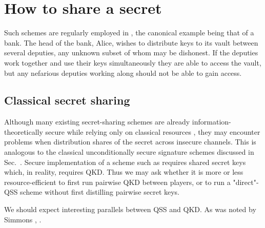 \section{How to share a secret}
Such schemes are regularly employed in , the canonical example being that of a bank. The head of the bank, Alice, wishes to distribute keys to its vault between several deputies, any unknown subset of whom may be dishonest. If the deputies work together and use their keys simultaneously they are able to access the vault, but any nefarious deputies working along should not be able to gain access.

\subsection*{Classical secret sharing}
Although many existing secret-sharing schemes are already information-theoretically secure while relying only on classical resources , they may encounter problems when distribution shares of the secret across insecure channels.  This is analogous to the classical unconditionally secure signature schemes discussed in Sec.~. Secure implementation of a scheme such as  requires shared secret keys which, in reality, requires QKD. Thus we may ask whether it is more or less resource-efficient to first run pairwise QKD between players, or to run a "direct"-QSS scheme without first distilling pairwise secret keys.

We should expect interesting parallels between QSS and QKD. As was noted by Simmons , .





%

